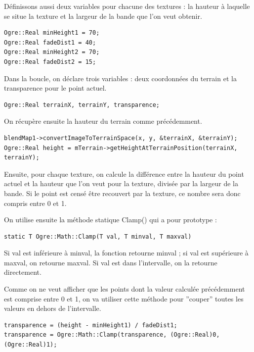 Définissons aussi deux variables pour chacune des textures : la hauteur à laquelle se situe la texture et la largeur de la bande que l'on veut obtenir.

\begin{lstlisting}[caption={}]
Ogre::Real minHeight1 = 70;
Ogre::Real fadeDist1 = 40;
Ogre::Real minHeight2 = 70;
Ogre::Real fadeDist2 = 15;
\end{lstlisting}

Dans la boucle, on déclare trois variables : deux coordonnées du terrain et la transparence pour le point actuel.

\begin{lstlisting}[caption={}]
Ogre::Real terrainX, terrainY, transparence;
\end{lstlisting}

On récupère ensuite la hauteur du terrain comme précédemment.

\begin{lstlisting}[caption={}]
blendMap1->convertImageToTerrainSpace(x, y, &terrainX, &terrainY);
Ogre::Real height = mTerrain->getHeightAtTerrainPosition(terrainX, terrainY);
\end{lstlisting}

Ensuite, pour chaque texture, on calcule la différence entre la hauteur du point actuel et la hauteur que l'on veut pour la texture, divisée par la largeur de la bande. Si le point est censé être recouvert par la texture, ce nombre sera donc compris entre 0 et 1.

On utilise ensuite la méthode statique Clamp() qui a pour prototype :

\begin{lstlisting}[caption={Utilisation de la méthode statique Clamp()}]
static T Ogre::Math::Clamp(T val, T minval, T maxval)
\end{lstlisting}

Si val est inférieure à minval, la fonction retourne minval ; si val est supérieure à maxval, on retourne maxval. Si val est dans l'intervalle, on la retourne directement.

Comme on ne veut afficher que les points dont la valeur calculée précédemment est comprise entre 0 et 1, on va utiliser cette méthode pour ''couper'' toutes les valeurs en dehors de l'intervalle.

\begin{lstlisting}[caption={}]
transparence = (height - minHeight1) / fadeDist1;
transparence = Ogre::Math::Clamp(transparence, (Ogre::Real)0, (Ogre::Real)1);
\end{lstlisting}


